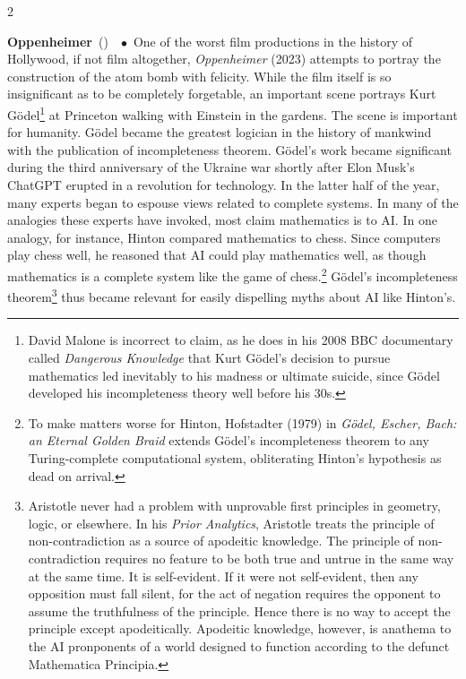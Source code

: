 \documentclass[10pt,a4paper,twoside]{article} %
\newcommand{\entry}[4]{\markboth{#1}{#1}\textbf{#1}\ {(#2)}\ \textit{#3}\ $\bullet$\ {#4}}  %
\begin{document}
\begin{multicols}{2}
\entry{Oppenheimer} {} {} {One of the worst film productions in the history of Hollywood, if not film altogether, \emph{Oppenheimer} (2023) attempts to portray the construction of the atom bomb with felicity. While the film itself is so insignificant as to be completely forgetable, an important scene portrays Kurt Gödel\footnote{ David Malone is incorrect to claim, as he does in his 2008 BBC documentary called \emph{Dangerous Knowledge} that Kurt Gödel's decision to pursue mathematics led inevitably to his madness or ultimate suicide, since Gödel developed his incompleteness theory well before his 30s.} at Princeton walking with Einstein in the gardens. The scene is important for humanity. Gödel became the greatest logician in the history of mankwind with the publication of incompleteness theorem. Gödel's work became significant during the third anniversary of the Ukraine war shortly after Elon Musk's ChatGPT erupted in a revolution for technology. In the latter half of the year, many experts began to espouse views related to complete systems. In many of the analogies these experts have invoked, most claim mathematics is to AI. In one analogy, for instance, Hinton compared mathematics to chess. Since computers play chess well, he reasoned that AI could play mathematics well, as though mathematics is a complete system like the game of chess.\footnote{To make matters worse for Hinton, Hofstadter (1979) in \emph{Gödel, Escher, Bach: an Eternal Golden Braid} extends Gödel's incompleteness theorem to any Turing-complete computational system, obliterating Hinton's hypothesis as dead on arrival.} Gödel's incompleteness theorem\footnote{Aristotle never had a problem with unprovable first principles in geometry, logic, or elsewhere. In his \emph{Prior Analytics}, Aristotle treats the principle of non-contradiction as a source of apodeitic knowledge. The principle of non-contradiction requires no feature to be both true and untrue in the same way at the same time. It is self-evident. If it were not self-evident, then any opposition must fall silent, for the act of negation requires the opponent to assume the truthfulness of the principle. Hence there is no way to accept the principle except apodeitically. Apodeitic knowledge, however, is anathema to the AI pronponents of a world designed to function according to the defunct Mathematica Principia.} thus became relevant for easily dispelling myths about AI like Hinton's. 
}



\end{multicols}
\end{document}
